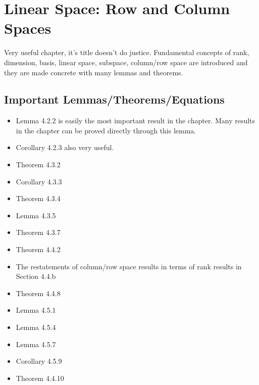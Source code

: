 \documentclass[a4paper, oneside]{book}
\begin{document}
\chapter{Linear Space: Row and Column Spaces}

Very useful chapter, it's title doesn't do justice. Fundamental concepts of rank, dimension, basis, linear space, subspace, column/row space are introduced and they are made concrete with many lemmas and theorems.

\section{Important Lemmas/Theorems/Equations}
\begin{itemize}
\item Lemma 4.2.2 is easily the most important result in the chapter. Many results in the chapter can be proved directly through this lemma.
\item Corollary 4.2.3 also very useful.
\item Theorem 4.3.2
\item Corollary 4.3.3
\item Theorem 4.3.4
\item Lemma 4.3.5
\item Theorem 4.3.7
\item Theorem 4.4.2
\item The restatements of column/row space results in terms of rank results in Section 4.4.b
\item Theorem 4.4.8
\item Lemma 4.5.1
\item Lemma 4.5.4
\item Lemma 4.5.7
\item Corollary 4.5.9
\item Theorem 4.4.10
\end{itemize}
\end{document}
